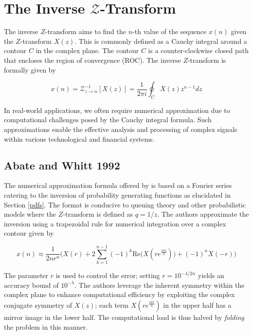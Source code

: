\documentclass[a4paper]{report}
\begin{document}
\section{The Inverse \texorpdfstring{$\mathcal{Z}$}{Lg}-Transform}

The inverse $Z$-transform aims to find the $n$-th value of the sequence $x(n)$ given the $Z$-transform $X(z)$. This is commonly defined as a Cauchy integral around a contour $C$ in the complex plane. The contour $C$ is a counter-clockwise closed path that encloses the region of convergence (ROC). The inverse $Z$-transform is formally given by

\begin{equation}\label{inverse_z-transform}
	x(n) = \mathcal{Z}^{-1}_{z \rightarrow n}[X(z)] = \frac{1}{2\pi i} \oint_C X(z)z^{n-1}dz
\end{equation}

In real-world applications, we often require numerical approximation due to computational challenges posed by the Cauchy integral formula. Such approximations enable the effective analysis and processing of complex signals within various technological and financial systems.

\subsection{Abate and Whitt 1992}
The numerical approximation formula offered by \citet{AbateWhitt1992a, AbateWhitt1992b} is based on a Fourier series catering to the inversion of probability generating functions as elucidated in Section \ref{pdfs}. The format is conducive to queuing theory and other probabilistic models where the $Z$-transform is defined as $q = 1 / z$. The authors approximate the inversion using a trapezoidal rule for numerical integration over a complex contour given by

\begin{equation}\label{aw_inversion_original}
	x(n) \approx \frac{1}{2nr^n} \biggr( X(r) + 2\sum^{n-1}_{k = 1} (-1)^k \mathrm{Re}\bigg( X(re^{\frac{ik\pi}{n}})\bigg) + (-1)^nX(-r) \biggl)
\end{equation}

The parameter $r$ is used to control the error; setting $r = 10^{-\lambda / 2n}$ yields an accuracy bound of $10^{-\lambda}$. The authors leverage the inherent symmetry within the complex plane to enhance computational efficiency by exploiting the complex conjugate symmetry of $X(z)$; each term $X(re^{\frac{ik\pi}{n}})$ in the upper half has a mirror image in the lower half. The computational load is thus halved by \textit{folding} the problem in this manner.
\end{document}
